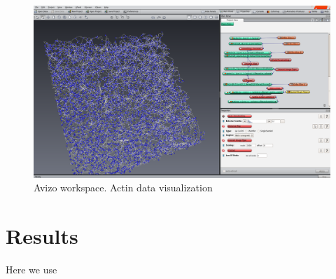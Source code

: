 \begin{figure}[h]

 
\includegraphics[width=1.1\textwidth]{Figures/avizoworkspaceactin.png}%


% 
% 
\caption[Avizo image: Actin network visualization and workspace]{Avizo
workspace. Actin data visualization}
\label{fig:avizo_workspace}
\end{figure}

\section{Results}

Here we use 

